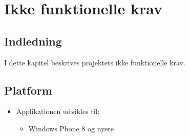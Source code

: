 \chapter{Ikke funktionelle krav} 
\label{chp:IkkeFunktionelleKrav}

\section{Indledning}
I dette kapitel beskrives projektets ikke funktionelle krav.


\section{Platform}
\begin{itemize}
\item Applikationen udvikles til:
\begin{itemize}
\item Windows Phone 8 og nyere
\end{itemize} 

\end{itemize}
